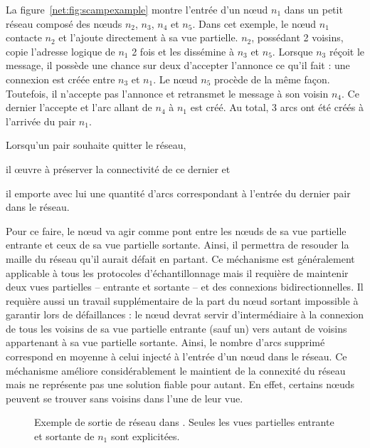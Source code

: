 \begin{itemize}
  La figure~\ref{net:fig:scampexample} montre l'entrée d'un nœud $n_1$ dans un
  petit réseau \SCAMP composé des nœuds $n_2$, $n_3$, $n_4$ et $n_5$. Dans cet
  exemple, le nœud $n_1$ contacte $n_2$ et l'ajoute directement à sa vue
  partielle. $n_2$, possédant 2 voisins, copie l'adresse logique de $n_1$ 2 fois
  et les dissémine à $n_3$ et $n_5$. Lorsque $n_3$ réçoit le message, il possède
  une chance sur deux d'accepter l'annonce ce qu'il fait : une connexion est
  créée entre $n_3$ et $n_1$. Le nœud $n_5$ procède de la même façon. Toutefois,
  il n'accepte pas l'annonce et retransmet le message à son voisin $n_4$. Ce
  dernier l'accepte et l'arc allant de $n_4$ à $n_1$ est créé. Au total, 3 arcs
  ont été créés à l'arrivée du pair $n_1$.


  Lorsqu'un pair souhaite quitter le réseau, 
  \begin{inparaenum}[(i)]
  \item il œuvre à préserver la connectivité de ce dernier et
  \item il emporte avec lui une quantité d'arcs correspondant à l'entrée du
    dernier pair dans le réseau.
  \end{inparaenum}
  Pour ce faire, le nœud va agir comme pont entre les nœuds de sa vue partielle
  entrante et ceux de sa vue partielle sortante. Ainsi, il permettra de resouder
  la maille du réseau qu'il aurait défait en partant. Ce méchanisme est
  généralement applicable à tous les protocoles d'échantillonnage mais il
  requière de maintenir deux vues partielles -- entrante et sortante -- et des
  connexions bidirectionnelles. Il requière aussi un travail supplémentaire de
  la part du nœud sortant impossible à garantir lors de défaillances : le nœud
  devrat servir d'intermédiaire à la connexion de tous les voisins de sa vue
  partielle entrante (sauf un) vers autant de voisins appartenant à sa vue
  partielle sortante. Ainsi, le nombre d'arcs supprimé correspond en moyenne à
  celui injecté à l'entrée d'un nœud dans le réseau. Ce méchanisme améliore
  considérablement le maintient de la connexité du réseau mais ne représente pas
  une solution fiable pour autant. En effet, certains nœuds peuvent se trouver
  sans voisins dans l'une de leur vue.
  

  \begin{figure}
    \centering {}
    \hspace{45pt}
    \caption{\label{net:fig:scampexample2} Exemple de sortie de réseau dans
      \SCAMP. Seules les vues partielles entrante et sortante de $n_1$ sont
      explicitées.}
  \end{figure}


\end{itemize}
